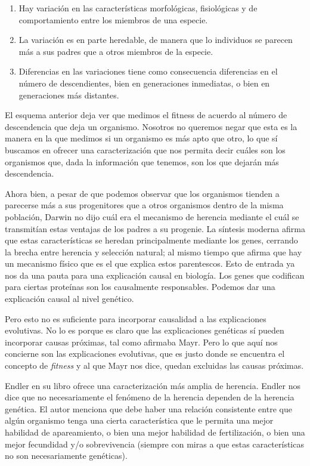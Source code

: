 \begin{enumerate}
  \item Hay variación en las características morfológicas, fisiológicas y de comportamiento entre los miembros de una especie.
  \item La variación es en parte heredable, de manera que lo individuos se parecen más a sus padres que a otros miembros de la especie.
  \item Diferencias en las variaciones tiene como consecuencia diferencias en el número de descendientes, bien en generaciones inmediatas, o bien en generaciones más distantes\cite{Godfrey-Smith2013}.
\end{enumerate}


El esquema anterior deja ver que medimos el fitness de acuerdo al número de descendencia que deja un organismo. Nosotros no queremos negar que esta es la manera en la que medimos si un organismo es más apto que otro, lo que sí buscamos en ofrecer una caracterización que nos permita decir cuáles son los organismos que, dada la información que tenemos, son los que dejarán más descendencia.

Ahora bien, a pesar de que podemos observar que los organismos tienden a parecerse más a sus progenitores que a otros organismos dentro de la misma población, Darwin no dijo cuál era el mecanismo de herencia mediante el cuál se transmitían estas ventajas de los padres a su progenie. La síntesis moderna afirma que estas características se heredan principalmente mediante los genes, cerrando la brecha entre herencia y selección natural; al mismo tiempo que afirma que hay un mecanismo físico que es el que explica estos parentescos. Esto de entrada ya nos da una pauta para una explicación causal en biología. Los genes que codifican para ciertas proteínas son los causalmente responsables. Podemos dar una explicación causal al nivel genético.

Pero esto no es suficiente para incorporar causalidad a las explicaciones evolutivas. No lo es porque es claro que las explicaciones genéticas sí pueden incorporar causas próximas, tal como afirmaba Mayr. Pero lo que aquí nos concierne son las explicaciones evolutivas, que es justo donde se encuentra el concepto de \emph{fitness} y al que Mayr nos dice, quedan excluidas las causas próximas.

Endler en su libro \cite{Endler1986} ofrece una caracterización más amplia de herencia. Endler nos dice que no necesariamente el fenómeno de la herencia dependen de la herencia genética. El autor menciona que debe haber una relación consistente entre que algún organismo tenga una cierta característica que le permita una mejor habilidad de apareamiento, o bien una mejor habilidad de fertilización, o bien una mejor fecundidad y/o sobrevivencia (siempre con miras a que estas características no son necesariamente genéticas).

